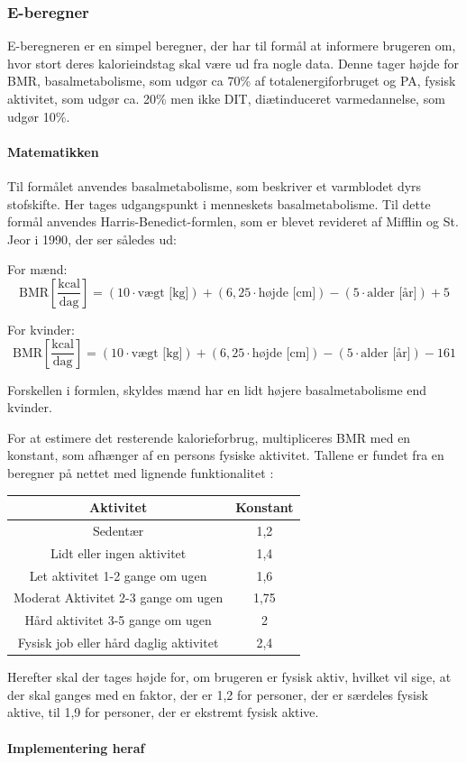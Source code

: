 \subsubsection{E-beregner}
E-beregneren er en simpel beregner, der har til formål at informere brugeren om, hvor stort deres kalorieindstag skal være ud fra nogle data. Denne tager højde for BMR, basalmetabolisme, som udgør ca 70\% af totalenergiforbruget og PA, fysisk aktivitet, som udgør ca. 20\% men ikke DIT, diætinduceret varmedannelse, som udgør 10\%\cite{EE-artikel}.

\paragraph{Matematikken}
Til formålet anvendes basalmetabolisme, som beskriver et varmblodet dyrs stofskifte.\cite{BMR-artikel} Her tages udgangspunkt i menneskets basalmetabolisme. Til dette formål anvendes Harris-Benedict-formlen, som er blevet revideret af Mifflin og St. Jeor i 1990\cite{Harris-Benedict-formel}, der ser således ud:

For mænd:
\begin{equation}
    \text{BMR} \left[\dfrac{\text{kcal}}{\text{dag}}\right] = (10 \cdot \text{vægt [kg]}) + (6,25 \cdot \text{højde [cm]}) - (5 \cdot \text{alder [år]}) + 5
\end{equation}

For kvinder:
\begin{equation}
    \text{BMR} \left[\dfrac{\text{kcal}}{\text{dag}}\right] = (10 \cdot \text{vægt [kg]}) + (6,25 \cdot \text{højde [cm]}) - (5 \cdot \text{alder [år]}) - 161
\end{equation}

Forskellen i formlen, skyldes mænd har en lidt højere basalmetabolisme end kvinder.

For at estimere det resterende kalorieforbrug, multipliceres BMR med en konstant, som afhænger af en persons fysiske aktivitet. Tallene er fundet fra en beregner på nettet med lignende funktionalitet \cite{OMNI-calc}:
\begin{table}[H]
    \centering
    \begin{tabular}{|c|c|}
        \hline
        \textbf{Aktivitet} & \textbf{Konstant} \\
        \hline
        Sedentær & 1,2 \\
        Lidt eller ingen aktivitet & 1,4 \\
        Let aktivitet 1-2 gange om ugen & 1,6 \\
        Moderat Aktivitet 2-3 gange om ugen & 1,75 \\
        Hård aktivitet 3-5 gange om ugen & 2 \\
        Fysisk job eller hård daglig aktivitet & 2,4 \\
        \hline
    \end{tabular}
\end{table}

Herefter skal der tages højde for, om brugeren er fysisk aktiv, hvilket vil sige, at der skal ganges med en faktor, der er 1,2 for personer, der er særdeles fysisk aktive, til 1,9 for personer, der er ekstremt fysisk aktive.
\paragraph{Implementering heraf}